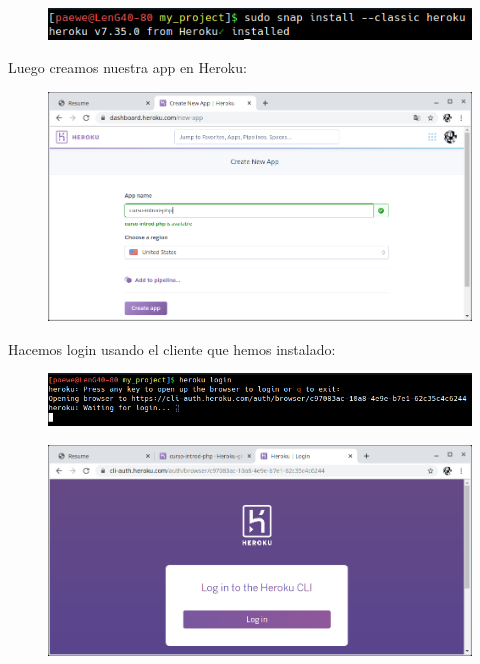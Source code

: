 \documentclass{article}
\begin{document}
\begin{figure}[h!]
  \centering
  \includegraphics[scale=0.5]{./Pictures/247_heroku_instalado.png}
\end{figure}

Luego creamos nuestra app en Heroku:

\begin{figure}[h!]
  \centering
  \includegraphics[scale=0.5]{./Pictures/245_crear_app_heroku.png}
\end{figure}

Hacemos login usando el cliente que hemos instalado:

\begin{figure}[h!]
  \centering
  \includegraphics[scale=0.5]{./Pictures/248_login_heroku.png}
\end{figure}

\begin{figure}[h!]
  \centering
  \includegraphics[scale=0.5]{./Pictures/249_login_browser.png}
\end{figure}
\end{document}
